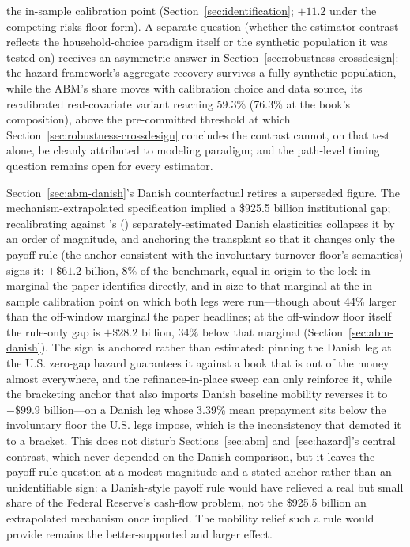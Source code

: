 \documentclass[12pt]{article}
\newcommand{\citepos}[1]{\citeauthor{#1}'s (\citeyear{#1})}
\begin{document}
the in-sample calibration point (Section~\ref{sec:identification}; $+11.2$ under the competing-risks floor form). A separate question (whether the estimator contrast reflects the household-choice paradigm itself or the synthetic population it was tested on) receives an asymmetric answer in Section~\ref{sec:robustness-crossdesign}: the hazard framework's aggregate recovery survives a fully synthetic population, while the ABM's share moves with calibration choice and data source, its recalibrated real-covariate variant reaching 59.3\% (76.3\% at the book's composition), above the pre-committed threshold at which Section~\ref{sec:robustness-crossdesign} concludes the contrast cannot, on that test alone, be cleanly attributed to modeling paradigm; and the path-level timing question remains open for every estimator.

Section~\ref{sec:abm-danish}'s Danish counterfactual retires a superseded figure. The mechanism-extrapolated specification implied a \$925.5 billion institutional gap; recalibrating against \citepos{berger2026} separately-estimated Danish elasticities collapses it by an order of magnitude, and anchoring the transplant so that it changes only the payoff rule (the anchor consistent with the involuntary-turnover floor's semantics) signs it: $+\$61.2$ billion, 8\% of the benchmark, equal in origin to the lock-in marginal the paper identifies directly, and in size to that marginal at the in-sample calibration point on which both legs were run---though about 44\% larger than the off-window marginal the paper headlines; at the off-window floor itself the rule-only gap is $+\$28.2$ billion, 34\% below that marginal (Section~\ref{sec:abm-danish}). The sign is anchored rather than estimated: pinning the Danish leg at the U.S. zero-gap hazard guarantees it against a book that is out of the money almost everywhere, and the refinance-in-place sweep can only reinforce it, while the bracketing anchor that also imports Danish baseline mobility reverses it to $-\$99.9$ billion---on a Danish leg whose 3.39\% mean prepayment sits below the involuntary floor the U.S. legs impose, which is the inconsistency that demoted it to a bracket. This does not disturb Sections~\ref{sec:abm} and~\ref{sec:hazard}'s central contrast, which never depended on the Danish comparison, but it leaves the payoff-rule question at a modest magnitude and a stated anchor rather than an unidentifiable sign: a Danish-style payoff rule would have relieved a real but small share of the Federal Reserve's cash-flow problem, not the \$925.5 billion an extrapolated mechanism once implied. The mobility relief such a rule would provide remains the better-supported and larger effect.
\end{document}
